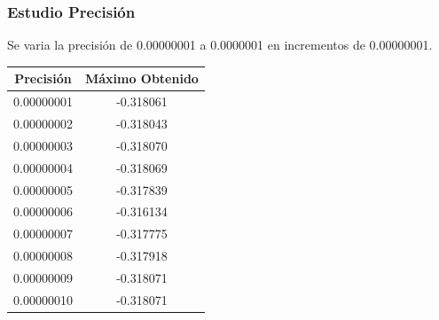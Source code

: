 \documentclass[12pt]{article}
\begin{document}
\subsubsection*{Estudio Precisión}
	Se varia la precisión de 0.00000001 a 0.0000001 en incrementos de 0.00000001.
\begin{table}[H]
\begin{center}
\begin{tabular}{|cc|} \hline
Precisión & Máximo Obtenido \\  \hline
0.00000001 & -0.318061 \\ 
0.00000002 & -0.318043 \\ 
0.00000003 & -0.318070 \\
0.00000004 & -0.318069 \\
0.00000005 & -0.317839 \\
0.00000006 & -0.316134 \\
0.00000007 & -0.317775 \\
0.00000008 & -0.317918 \\ 
0.00000009 & -0.318071 \\
0.00000010 & -0.318071 \\  \hline
\end{tabular}
\end{center}
\end{table}


	
\end{document}
